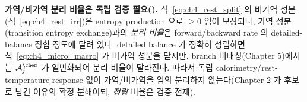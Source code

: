 \begin{flagbox}
\textbf{가역/비가역 분리 비율은 독립 검증 필요().} 식~\eqref{eq:ch4_rest_split} 의 비가역 성분
(식~\eqref{eq:ch4_rest_irr})은 entropy production 으로 $\ge0$ 임이 보장되나, 가역 성분(transition entropy
exchange)과의 \emph{분리 비율}은 forward/backward rate 의 detailed-balance 정합 정도에 달려 있다. detailed
balance 가 정확히 성립하면 식~\eqref{eq:ch4_micro_macro} 가 비가역 성분을 닫지만, branch 비대칭(Chapter 5)에서는
$\mathcal A_j^{\chem}$ 가 일반화되어 분리 비율이 달라진다. 따라서 독립 calorimetry/rest-temperature response
없이 가역/비가역을 임의 분리하지 않는다(Chapter 2 가 후보로 남긴 이유의 확정 분해이되, \emph{정량} 비율은
검증 전제).
\end{flagbox}

